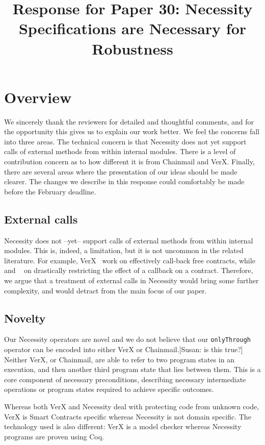 \documentclass[11pt]{amsart}
\title{Response for Paper 30: Necessity Specifications are Necessary for Robustness }
\begin{document}
\maketitle
\section{Overview}
We sincerely thank the reviewers for detailed and thoughtful comments, and for the opportunity this gives us to explain our work better. We feel the concerns fall into three areas. The technical concern is that Necessity does not yet support calls of external methods from within internal modules. There is a level of contribution concern as to how different it is from Chainmail and VerX. Finally, there are several areas where the presentation of our ideas should be made clearer. The changes we describe in this response could comfortably be made before the February deadline.

\subsection*{External calls}

Necessity does not --yet-- support calls of external methods from within internal modules. This is, indeed, a limitation, but it is not uncommon in the related literature. For example, VerX~\citep{Permenev} work on effectively call-back free contracts, while~\citep{Grossman} and ~\citep{Albert} on drastically restricting the effect of a callback on a contract. Therefore, we argue that a treatment of  external calls in Necessity would bring some further complexity, and would  detract from the main focus of our paper.  

\subsection*{Novelty}

Our Necessity operators are novel and we do not believe that our {\tt{onlyThrough}} operator can be encoded into either VerX or Chainmail.[Susan: is this true?] Neither VerX, or Chainmail, are able to refer to two program states in an execution, and then another third program state that lies between them. This is a core component of necessary preconditions, describing necessary intermediate operations or program states required to achieve specific outcomes.

Whereas both VerX and Necessity deal with protecting code from unknown code, VerX is Smart Contracts specific whereas Necessity is not domain specific.  The technology used is also different: VerX is a model checker whereas Necessity programs are proven using Coq.
\end{document}
